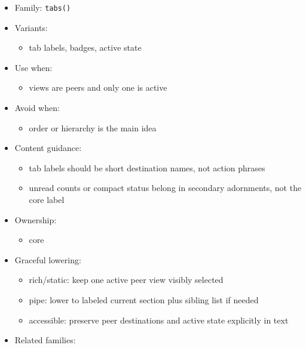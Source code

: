 \begin{itemize}
\tightlist
\item
  Family: \texttt{t\allowbreak{}a\allowbreak{}b\allowbreak{}s\allowbreak{}(\allowbreak{})}
\item
  Variants:

  \begin{itemize}
  \tightlist
  \item
    tab labels, badges, active state
  \end{itemize}
\item
  Use when:

  \begin{itemize}
  \tightlist
  \item
    views are peers and only one is active
  \end{itemize}
\item
  Avoid when:

  \begin{itemize}
  \tightlist
  \item
    order or hierarchy is the main idea
  \end{itemize}
\item
  Content guidance:

  \begin{itemize}
  \tightlist
  \item
    tab labels should be short destination names, not action phrases
  \item
    unread counts or compact status belong in secondary adornments, not the core label
  \end{itemize}
\item
  Ownership:

  \begin{itemize}
  \tightlist
  \item
    core
  \end{itemize}
\item
  Graceful lowering:

  \begin{itemize}
  \tightlist
  \item
    rich/static: keep one active peer view visibly selected
  \item
    pipe: lower to labeled current section plus sibling list if needed
  \item
    accessible: preserve peer destinations and active state explicitly in text
  \end{itemize}
\item
  Related families:


\end{itemize}
